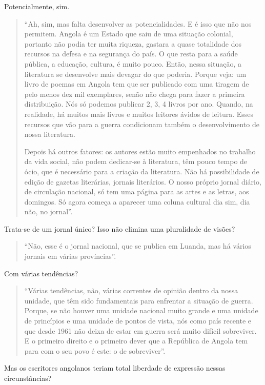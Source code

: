 \documentclass[
  letterpaper,
  DIV=11,
  numbers=noendperiod]{scrreprt}
\begin{document}
Potencialmente, sim.

\begin{quote}
``Ah, sim, mas falta desenvolver as potencialidades. E é isso que não
nos permitem. Angola é um Estado que saiu de uma situação colonial,
portanto não podia ter muita riqueza, gastara a quase totalidade dos
recursos na defesa e na segurança do país. O que resta para a saúde
pública, a educação, cultura, é muito pouco. Então, nessa situação, a
literatura se desenvolve mais devagar do que poderia. Porque veja: um
livro de poemas em Angola tem que ser publicado com uma tiragem de pelo
menos dez mil exemplares, senão não chega para fazer a primeira
distribuição. Nós só podemos publicar 2, 3, 4 livros por ano. Quando, na
realidade, há muitos mais livros e muitos leitores ávidos de leitura.
Esses recursos que vão para a guerra condicionam também o
desenvolvimento de nossa literatura.

Depois há outros fatores: os autores estão muito empenhados no trabalho
da vida social, não podem dedicar-se à literatura, têm pouco tempo de
ócio, que é necessário para a criação da literatura. Não há
possibilidade de edição de gazetas literárias, jornais literários. O
nosso próprio jornal diário, de circulação nacional, só tem uma página
para as artes e as letras, aos domingos. Só agora começa a aparecer uma
coluna cultural dia sim, dia não, no jornal''.
\end{quote}

Trata-se de um jornal único? Isso não elimina uma pluralidade de visões?

\begin{quote}
``Não, esse é o jornal nacional, que se publica em Luanda, mas há vários
jornais em várias províncias''.
\end{quote}

Com várias tendências?

\begin{quote}
``Várias tendências, não, várias correntes de opinião dentro da nossa
unidade, que têm sido fundamentais para enfrentar a situação de guerra.
Porque, se não houver uma unidade nacional muito grande e uma unidade de
princípios e uma unidade de pontos de vista, nós como país recente e que
desde 1961 não deixa de estar em guerra será muito difícil sobreviver. E
o primeiro direito e o primeiro dever que a República de Angola tem para
com o seu povo é este: o de sobreviver''.
\end{quote}

Mas os escritores angolanos teriam total liberdade de expressão nessas
circunstâncias?
\end{document}
